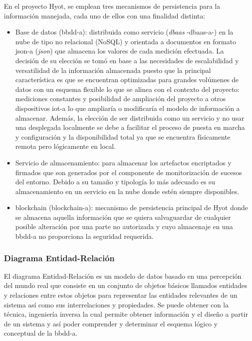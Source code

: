 \documentclass[12pt,a4paper, twoside]{report}
\begin{document}
	En el proyecto Hyot, se emplean tres mecanismos de persistencia para la información manejada, cada uno de ellos con una finalidad distinta:
	
	\begin{itemize}
		\item Base de datos (\gls{bbdd-a}): distribuida como servicio (\textit{\gls{dbaas}} -\gls{dbaas-a}-) \cite{gonzalez:2011:TCCS} en la nube de tipo no relacional (NoSQL) y orientada a documentos en formato \gls{json-a} (\textit{\gls{json}}) que almacena los valores de cada medición efectuada. La decisión de su elección se tomó en base a las necesidades de escalabilidad y versatilidad de la información almacenada puesto que la principal característica es que se encuentran optimizadas para grandes volúmenes de datos con un esquema flexible lo que se alinea con el contexto del proyecto: mediciones constantes y posibilidad de ampliación del proyecto a otros dispositivos \gls{iot-a} lo que ampliaría o modificaría el modelo de información a almacenar. Además, la elección de ser distribuida como un servicio y no usar una desplegada localmente se debe a facilitar el proceso de puesta en marcha y configuración y la disponibilidad total ya que se encuentra físicamente remota pero lógicamente en local.
		\item Servicio de almacenamiento: para almacenar los artefactos encriptados y firmados que son generados por el componente de monitorización de sucesos del entorno. Debido a su tamaño y tipología lo más adecuado es su almacenamiento en un servicio en la nube donde estén siempre disponibles.	
		\item \Gls{blockchain} (\gls{blockchain-a}): mecanismo de persistencia principal de Hyot donde se almacena aquella información que se quiera salvaguardar de cualquier posible alteración por una parte no autorizada y cuyo almacenaje en una \gls{bbdd-a} no proporciona la seguridad requerida.
	\end{itemize}
	
	\subsubsection{Diagrama Entidad-Relación}
	
	El diagrama Entidad-Relación es un modelo de datos basado en una percepción del mundo real que consiste en un conjunto de objetos básicos llamados entidades y relaciones entre estos objetos para representar las entidades relevantes de un sistema así como sus interrelaciones y propiedades. Se puede obtener con la técnica, ingeniería inversa la cual permite obtener información y el diseño a partir de un sistema y así poder comprender y determinar el esquema lógico y conceptual de la \gls{bbdd-a}. \\
	
\end{document}
